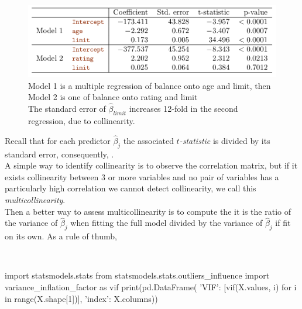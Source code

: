 \begin{figure}[H]
	\begin{center}
		\includegraphics[width=\textwidth]{./chap/1chap/2sec/2images/2_13collinearModelAndNonCollinearModel.png}
	\end{center}
	\caption{Model 1 is a multiple regression of balance onto age
	and limit, then Model 2 is one of balance onto rating and limit
	\\The standard error of $\widehat{\beta}_{limit}$ increases
	12-fold in the second regression, due to collinearity.}
	\label{fig:fig2.8}
\end{figure}
Recall that for each predictor $\widehat{\beta}_{j}$ the associated
\emph{$t$-statistic} is divided by its standard error, consequently,
.\\A simple
way to identify collinearity is to observe the correlation matrix, but
if it exists collinearity between $3$ or more variables and no pair of
variables has a particularly high correlation we cannot detect 
collinearity, we call this \emph{multicollinearity}.\\Then a better way
to assess multicollinearity is to compute the \emph{} it is the ratio of the variance of $\widehat{
\beta}_{j}$ when fitting the full model divided by the variance of $
\widehat{\beta}_{j}$ if fit on its own. As a rule of thumb, 
\begin{center}
	\\
\end{center}
\begin{python}
import statsmodels.stats
from statsmodels.stats.outliers_influence import variance_inflation_factor as vif
print(pd.DataFrame({ 
  'VIF': [vif(X.values, i) for i in range(X.shape[1])],
  'index': X.columns}))
\end{python}
